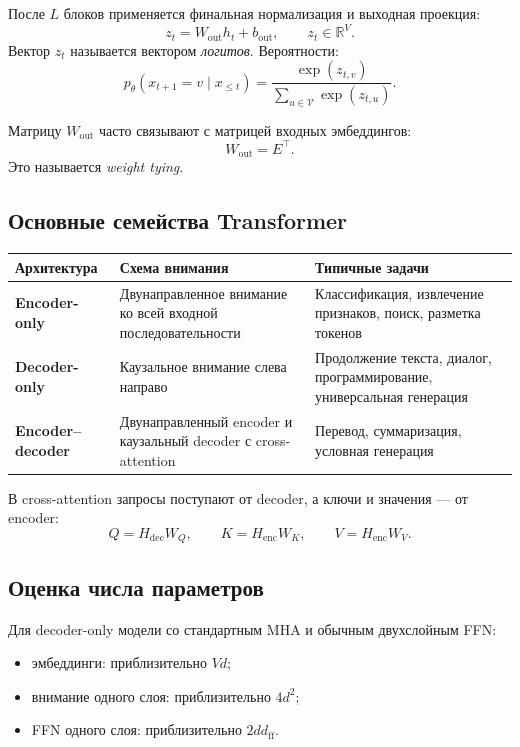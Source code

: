 \documentclass[12pt,a4paper]{article}
\newcommand{\R}{\mathbb{R}}
\newcommand{\V}{\mathcal{V}}
\newcommand{\1}{\mathbf{1}}
\theoremstyle{definition}
\theoremstyle{remark}
\begin{document}
После $L$ блоков применяется финальная нормализация и выходная проекция:
\[
z_t=W_{\mathrm{out}}h_t+b_{\mathrm{out}},
\qquad
z_t\in\R^V.
\]
Вектор $z_t$ называется вектором \emph{логитов}. Вероятности:
\[
p_\theta(x_{t+1}=v\mid x_{\leq t})
=
\frac{\exp(z_{t,v})}
{\sum_{u\in\V}\exp(z_{t,u})}.
\]

Матрицу $W_{\mathrm{out}}$ часто связывают с матрицей входных
эмбеддингов:
\[
W_{\mathrm{out}}=E^\top.
\]
Это называется \emph{weight tying}.

\subsection{Основные семейства Transformer}

\begin{center}
\begin{tabularx}{\textwidth}{>{\bfseries}l X X}
\toprule
Архитектура & Схема внимания & Типичные задачи \\
\midrule
Encoder-only
& Двунаправленное внимание ко всей входной последовательности
& Классификация, извлечение признаков, поиск, разметка токенов
\\
Decoder-only
& Каузальное внимание слева направо
& Продолжение текста, диалог, программирование, универсальная генерация
\\
Encoder--decoder
& Двунаправленный encoder и каузальный decoder с cross-attention
& Перевод, суммаризация, условная генерация
\\
\bottomrule
\end{tabularx}
\end{center}

В cross-attention запросы поступают от decoder, а ключи и значения ---
от encoder:
\[
Q=H_{\mathrm{dec}}W_Q,
\qquad
K=H_{\mathrm{enc}}W_K,
\qquad
V=H_{\mathrm{enc}}W_V.
\]

\subsection{Оценка числа параметров}

Для decoder-only модели со стандартным MHA и обычным двухслойным FFN:

\begin{itemize}
    \item эмбеддинги: приблизительно $Vd$;
    \item внимание одного слоя: приблизительно $4d^2$;
    \item FFN одного слоя: приблизительно $2dd_{\mathrm{ff}}$.
\end{itemize}
\end{document}
